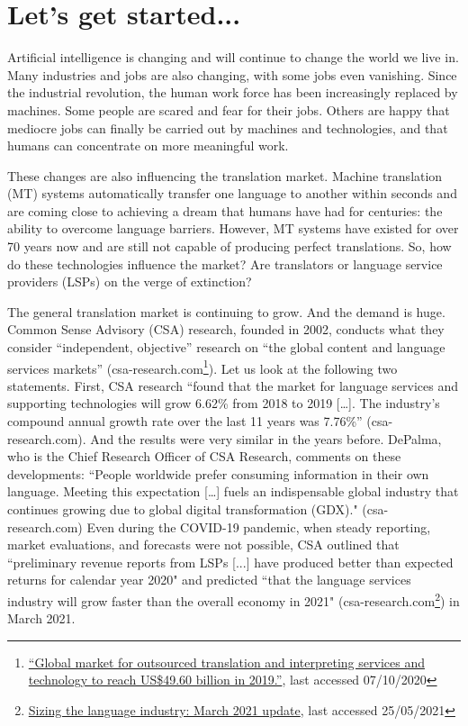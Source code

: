 \chapter{Let's get started...}\label{sec:1}
 \largerpage[-1]
Artificial intelligence is changing and will continue to change the world we live in. Many industries and jobs are also changing, with some jobs even vanishing. Since the industrial revolution, the human work force has been increasingly replaced by machines. Some people are scared and fear for their jobs. Others are happy that mediocre jobs can finally be carried out by machines and technologies, and that humans can concentrate on more meaningful work. 

These changes are also influencing the translation market. Machine translation (MT) systems automatically transfer one language to another within seconds and are coming close to achieving a dream that humans have had for centuries: the ability to overcome language barriers. However, MT systems have existed for over 70 years now and are still not capable of producing perfect translations. So, how do these technologies influence the market? Are translators or language service providers (LSPs) on the verge of extinction?

The general translation market is continuing to grow. And the demand is huge. Common Sense Advisory (CSA) research, founded in 2002, conducts what they consider “independent, objective” research on “the global content and language services markets” (csa-research.com\footnote{ \href{https://csa-research.com/More/Media/Press-Releases/ArticleID/546/Global-Market-for-Outsourced-Translation-and-Interpreting-Services-and-Technology-to-Reach-US-49-60-Billion-in-2019}{“Global market for outsourced translation and interpreting services and technology to reach US\$49.60 billion in 2019.”}, last accessed 07/10/2020}). Let us look at the following two statements. First, CSA research “found that the market for language services and supporting technologies will grow 6.62\% from 2018 to 2019 […]. The industry’s compound annual growth rate over the last 11 years was 7.76\%” (csa-research.com). And the results were very similar in the years before. DePalma, who is the Chief Research Officer of CSA Research, comments on these developments: ``People worldwide prefer consuming information in their own language. Meeting this expectation […] fuels an indispensable global industry that continues growing due to global digital transformation (GDX)." (csa-research.com) Even during the COVID-19 pandemic, when steady reporting, market evaluations, and forecasts were not possible, CSA outlined that ``preliminary revenue reports from LSPs [...] have produced better than expected returns for calendar year 2020" and predicted ``that the language services industry will grow faster than the overall economy in 2021" (csa-research.com\footnote{\href{https://insights.csa-research.com/reportaction/305013272/Marketing}{Sizing the language industry: March 2021 update}, last accessed 25/05/2021}) in March 2021.

